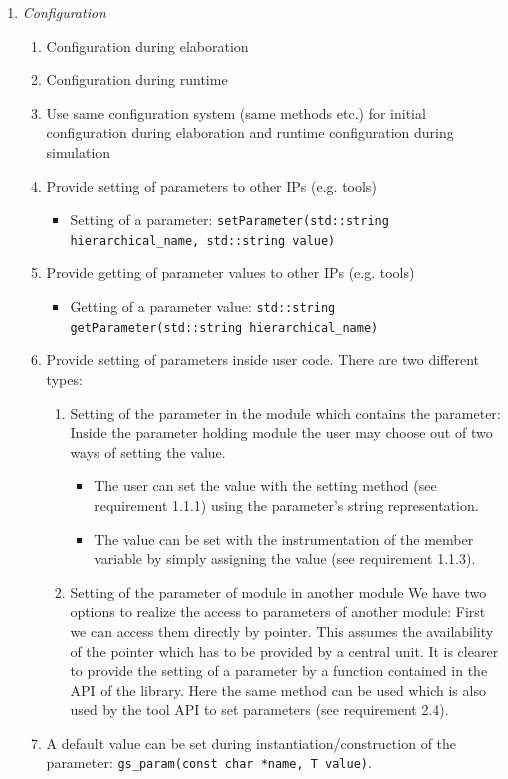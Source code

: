 \begin{enumerate}
	\item {\em Configuration} 
	\begin{enumerate}
		\item Configuration during elaboration 
		\item Configuration during runtime 
		\item Use same configuration system (same methods etc.) for initial configuration during elaboration and runtime configuration during simulation 
		\item Provide setting of parameters to other IPs (e.g. tools) 
		\begin{itemize}
			\item Setting of a parameter: \lstinline|setParameter(std::string hierarchical_name, std::string value)| 
		\end{itemize}
		\item Provide getting of parameter values to other IPs (e.g. tools) 
		\begin{itemize}
			\item Getting of a parameter value: \lstinline|std::string getParameter(std::string hierarchical_name)| 
		\end{itemize}
		\item Provide setting of parameters inside user code. There are two different types: 
		\begin{enumerate}
			\item Setting of the parameter in the module which contains the parameter: \newline Inside the parameter holding module the user may choose out of two ways of setting the value.  
			\begin{itemize}
				\item The user can set the value with the setting method (see requirement 1.1.1) using the parameter's string representation. 
				\item The value can be set with the instrumentation of the member variable by simply assigning the value (see requirement 1.1.3). 
			\end{itemize}
			\item Setting of the parameter of module in another module
						 We have two options to realize the access to parameters of another module: First we can access them directly by pointer. This assumes the availability of the pointer which has to be provided by a central unit. It is clearer to provide the setting of a parameter by a function contained in the API of the library. Here the same method can be used which is also used by the tool API to set parameters (see requirement 2.4). 
		\end{enumerate}
		\item A default value can be set during instantiation/construction of the parameter: \lstinline|gs_param(const char *name, T value)|. 
	\end{enumerate}


\end{enumerate}
